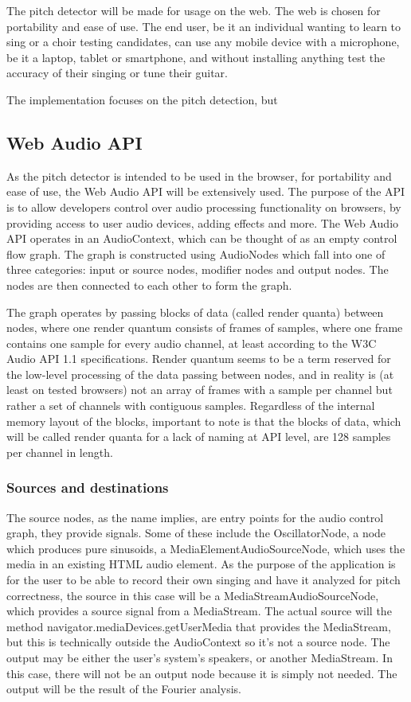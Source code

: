 The pitch detector will be made for usage on the web. The web is chosen for portability and ease of use. The end user, be it an individual wanting to learn to sing or a choir testing candidates, can use any mobile device with a microphone, be it a laptop, tablet or smartphone, and without installing anything test the accuracy of their singing or tune their guitar.

The implementation focuses on the pitch detection, but 

\subsection{Web Audio API}
As the pitch detector is intended to be used in the browser, for portability and ease of use, the Web Audio API will be extensively used. The purpose of the API is to allow developers control over audio processing functionality on browsers, by providing access to user audio devices, adding effects and more. 
The Web Audio API operates in an AudioContext, which can be thought of as an empty control flow graph. The graph is constructed using AudioNodes which fall into one of three categories: input or source nodes, modifier nodes and output nodes. The nodes are then connected to each other to form the graph. 

The graph operates by passing blocks of data (called render quanta) between nodes, where one render quantum consists of frames of samples, where one frame contains one sample for every audio channel, at least according to the W3C Audio API 1.1 specifications. Render quantum seems to be a term reserved for the low-level processing of the data passing between nodes, and in reality is (at least on tested browsers) not an array of frames with a sample per channel but rather a set of channels with contiguous samples. Regardless of the internal memory layout of the blocks, important to note is that the blocks of data, which will be called render quanta for a lack of naming at API level, are 128 samples per channel in length.


\subsubsection{Sources and destinations}
The source nodes, as the name implies, are entry points for the audio control graph, they provide signals. Some of these include the OscillatorNode, a node which produces pure sinusoids, a MediaElementAudioSourceNode, which uses the media in an existing HTML audio element. As the purpose of the application is for the user to be able to record their own singing and have it analyzed for pitch correctness, the source in this case will be a MediaStreamAudioSourceNode, which provides a source signal from a MediaStream. The actual source will the method navigator.mediaDevices.getUserMedia\(\) that provides the MediaStream, but this is technically outside the AudioContext so it's not a source node.  
The output may be either the user's system's speakers, or another MediaStream. In this case, there will not be an output node because it is simply not needed. The output will be the result of the Fourier analysis.

